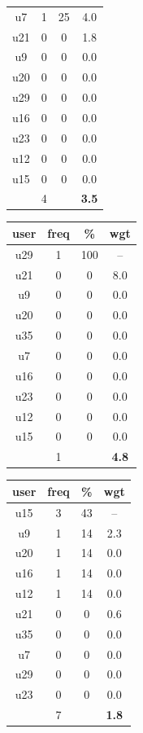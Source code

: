 \begin{table}
\begin{tabular}{ |c|c|c|c| }
	u7 & 1 & 25 & 4.0 \\
	u21 & 0 & 0 & 1.8 \\
	u9 & 0 & 0 & 0.0 \\
	u20 & 0 & 0 & 0.0 \\
	u29 & 0 & 0 & 0.0 \\
	u16 & 0 & 0 & 0.0 \\
	u23 & 0 & 0 & 0.0 \\
	u12 & 0 & 0 & 0.0 \\
	u15 & 0 & 0 & 0.0 \\
	 & 4 & & \textbf{3.5} \\
	\hline
\end{tabular}
\begin{tabular}{ |c|c|c|c| }
	\hline
	\textbf{user} & \textbf{freq} & \textbf{\%} & \textbf{wgt} \\
	\hline
	u29 & 1 & 100 & -- \\
	u21 & 0 & 0 & 8.0 \\
	u9 & 0 & 0 & 0.0 \\
	u20 & 0 & 0 & 0.0 \\
	u35 & 0 & 0 & 0.0 \\
	u7 & 0 & 0 & 0.0 \\
	u16 & 0 & 0 & 0.0 \\
	u23 & 0 & 0 & 0.0 \\
	u12 & 0 & 0 & 0.0 \\
	u15 & 0 & 0 & 0.0 \\
	 & 1 & & \textbf{4.8} \\
	\hline
\end{tabular}
\begin{tabular}{ |c|c|c|c| }
	\hline
	\textbf{user} & \textbf{freq} & \textbf{\%} & \textbf{wgt} \\
	\hline
	u15 & 3 & 43 & -- \\
	u9 & 1 & 14 & 2.3 \\
	u20 & 1 & 14 & 0.0 \\
	u16 & 1 & 14 & 0.0 \\
	u12 & 1 & 14 & 0.0 \\
	u21 & 0 & 0 & 0.6 \\
	u35 & 0 & 0 & 0.0 \\
	u7 & 0 & 0 & 0.0 \\
	u29 & 0 & 0 & 0.0 \\
	u23 & 0 & 0 & 0.0 \\
	 & 7 & & \textbf{1.8} \\
	\hline
\end{tabular}

\end{table}
